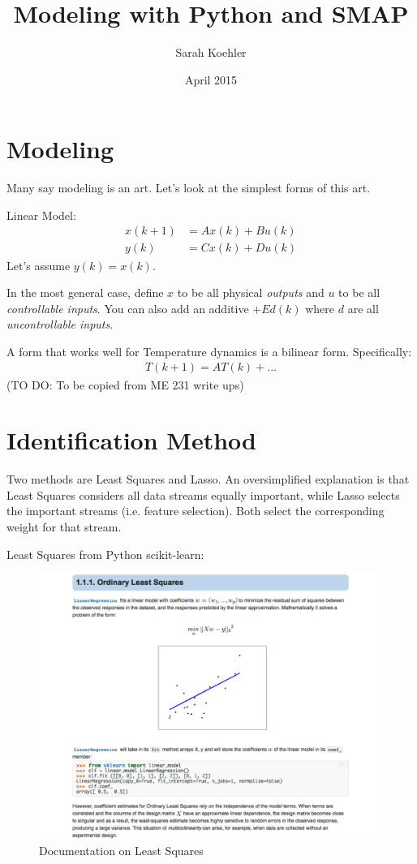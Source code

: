 \documentclass{article}
\title{Modeling with Python and SMAP}
\author{Sarah Koehler}
\date{April 2015}
\begin{document}
\maketitle

\section{Modeling}
Many say modeling is an art. Let's look at the simplest forms of this art.

Linear Model:
\begin{align}
x(k+1) &= Ax(k) + Bu(k)  \\
y(k) &= Cx(k) + Du(k)
\end{align}
\noindent Let's assume $y(k) = x(k)$. 

In the most general case, define $x$ to be all physical \textit{outputs} and $u$ to be all \textit{controllable inputs}. You can also add an additive $ + Ed(k)$ where $d$ are all \textit{uncontrollable inputs}. 

A form that works well for Temperature dynamics is a bilinear form. Specifically:
\begin{align}
T(k+1) = AT(k) + ...
\end{align}
(TO DO: To be copied from ME 231 write ups)

\pagebreak
\section{Identification Method}
Two methods are Least Squares and Lasso. An oversimplified explanation is that Least Squares considers all data streams equally important, while Lasso selects the important streams (i.e. feature selection). Both select the corresponding weight for that stream.

Least Squares from Python scikit-learn:
\begin{figure}[h]
\centering
\includegraphics[width=\columnwidth]{LeastSquaresPython.pdf}
\caption{Documentation on Least Squares}
\label{fig:lasso}
\end{figure}
\end{document}

